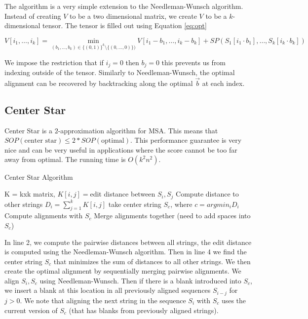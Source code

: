 \documentclass[11pt]{article}
\begin{document}
The algorithm is a very simple extension to the Needleman-Wunsch algorithm. 
Instead of creating $V$ to be a two dimensional matrix, we create $V$ to be a $k$-dimensional tensor. 
The tensor is filled out using Equation \ref{eq:opt}

\begin{equation}
    V[i_1, \dots, i_k] = \min_{(b_1, \dots, b_k) \in \{ (0, 1)\}^ k \setminus \{ (0, \dots, 0)\})}
    V[i_1-b_1, \dots, i_k-b_k] + SP(S_1[i_1 \cdot b_1], \dots, S_k[i_k \cdot b_k])
    \label{eq:opt}
\end{equation}

We impose the restriction that if $i_j = 0$ then $b_j = 0$ this prevents us from indexing outside of the tensor.
Similarly to Needleman-Wunsch, 
the optimal alignment can be recovered by backtracking along the optimal $\vec{b}$ at each index.


\subsection{Center Star}
Center Star is a $2$-approximation algorithm for MSA. 
This means that $SOP(\text{center star}) \leq 2 * SOP(\text{optimal})$.
This performance guarantee is very nice and can be very useful in applications
where the score cannot be too far away from optimal.
The running time is $O(k^2 n^2)$.

\begin{algorithm}[H]
    \caption{Center Star Algorithm}
    \label{alg:center_star}
    \begin{algorithmic}[1]
        \State K = kxk matrix, $K[i,j] = $edit distance between $S_i, S_j$
        \State Compute distance to other strings $D_i = \sum_{j=1}^k K[i,j]$
        \State take center string $S_c$, where $c = argmin_{i} D_i$
        \State Compute alignments with $S_c$
        \State Merge alignments together (need to add spaces into $S_c$)
    \EndFunction
    \end{algorithmic}
\end{algorithm}

In line 2, we compute the pairwise distances between all strings, 
the edit distance is computed using the Needleman-Wunsch algorithm.
Then in line 4 we find the center string $S_c$ that minimizes the sum of distances to all other strings.
We then create the optimal alignment by sequentially merging pairwise alignments.
We align $S_i, S_c$ using Needleman-Wunsch. 
Then if there is a blank introduced into $S_c$, 
we insert a blank at this location in all previously aligned sequences $S_{i - j}$ for $j > 0$.
We note that aligning the next string in the sequence $S_i$ with $S_c$ uses the current version of $S_c$ 
(that has blanks from previously aligned strings).
\end{document}
